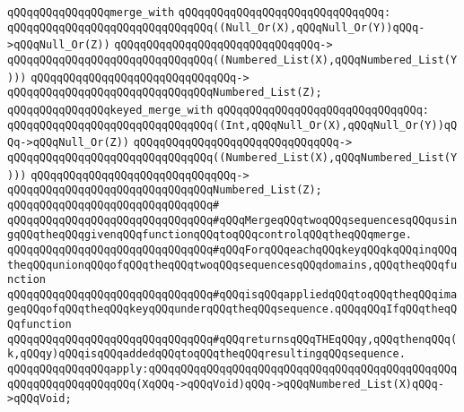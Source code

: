 \verb|qQQqqQQqqQQqqQQqmerge_with|\newline
\verb|qQQqqQQqqQQqqQQqqQQqqQQqqQQqqQQq:|\newline
\verb|qQQqqQQqqQQqqQQqqQQqqQQqqQQqqQQq((Null_Or(X),qQQqNull_Or(Y))qQQq->qQQqNull_Or(Z))|\newline
\verb|qQQqqQQqqQQqqQQqqQQqqQQqqQQqqQQq->|\newline
\verb|qQQqqQQqqQQqqQQqqQQqqQQqqQQqqQQq((Numbered_List(X),qQQqNumbered_List(Y)))|\newline
\verb|qQQqqQQqqQQqqQQqqQQqqQQqqQQqqQQq->|\newline
\verb|qQQqqQQqqQQqqQQqqQQqqQQqqQQqqQQqNumbered_List(Z);|\newline
\newline
\verb|qQQqqQQqqQQqqQQqkeyed_merge_with|\newline
\verb|qQQqqQQqqQQqqQQqqQQqqQQqqQQqqQQq:|\newline
\verb|qQQqqQQqqQQqqQQqqQQqqQQqqQQqqQQq((Int,qQQqNull_Or(X),qQQqNull_Or(Y))qQQq->qQQqNull_Or(Z))|\newline
\verb|qQQqqQQqqQQqqQQqqQQqqQQqqQQqqQQq->|\newline
\verb|qQQqqQQqqQQqqQQqqQQqqQQqqQQqqQQq((Numbered_List(X),qQQqNumbered_List(Y)))|\newline
\verb|qQQqqQQqqQQqqQQqqQQqqQQqqQQqqQQq->|\newline
\verb|qQQqqQQqqQQqqQQqqQQqqQQqqQQqqQQqNumbered_List(Z);|\newline
\verb|qQQqqQQqqQQqqQQqqQQqqQQqqQQqqQQq#|\newline
\verb|qQQqqQQqqQQqqQQqqQQqqQQqqQQqqQQq#qQQqMergeqQQqtwoqQQqsequencesqQQqusingqQQqtheqQQqgivenqQQqfunctionqQQqtoqQQqcontrolqQQqtheqQQqmerge.|\newline
\verb|qQQqqQQqqQQqqQQqqQQqqQQqqQQqqQQq#qQQqForqQQqeachqQQqkeyqQQqkqQQqinqQQqtheqQQqunionqQQqofqQQqtheqQQqtwoqQQqsequencesqQQqdomains,qQQqtheqQQqfunction|\newline
\verb|qQQqqQQqqQQqqQQqqQQqqQQqqQQqqQQq#qQQqisqQQqappliedqQQqtoqQQqtheqQQqimageqQQqofqQQqtheqQQqkeyqQQqunderqQQqtheqQQqsequence.qQQqqQQqIfqQQqtheqQQqfunction|\newline
\verb|qQQqqQQqqQQqqQQqqQQqqQQqqQQqqQQq#qQQqreturnsqQQqTHEqQQqy,qQQqthenqQQq(k,qQQqy)qQQqisqQQqaddedqQQqtoqQQqtheqQQqresultingqQQqsequence.|\newline
\newline
\verb|qQQqqQQqqQQqqQQqapply:qQQqqQQqqQQqqQQqqQQqqQQqqQQqqQQqqQQqqQQqqQQqqQQqqQQqqQQqqQQqqQQqqQQq(XqQQq->qQQqVoid)qQQq->qQQqNumbered_List(X)qQQq->qQQqVoid;|\newline
